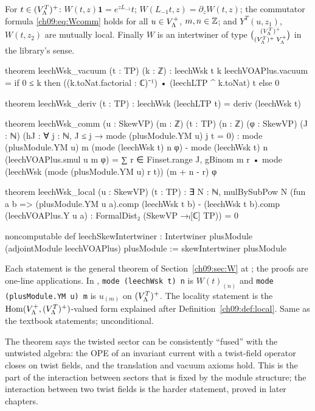 \begin{theorem}\label{ch09:thm:leechW}
For $t\in(V_{\Lambda}^{T})^{+}$: $W(t,z)\mathbf1=e^{zL_{-1}}t$; $W(L_{-1}t,z)=\partial_zW(t,z)$; the
commutator formula \eqref{ch09:eq:Wcomm} holds for all $u\in V_{\Lambda}^{+}$, $m,n\in{\mathbb{Z}}$; and
$Y^T(u,z_1)$, $W(t,z_2)$ are mutually local. Finally $W$ is an intertwiner of type
$\binom{(V_{\Lambda}^{T})^{+}}{(V_{\Lambda}^{T})^{+}\;V_{\Lambda}^{+}}$ in the library's sense.
\end{theorem}
\begin{leancode}
theorem leechWsk_vacuum (t : TP) (k : ℤ) :
    leechWsk t k leechVOAPlus.vacuum
      = if 0 ≤ k then ((k.toNat.factorial : ℂ)⁻¹) • (leechLTP ^ k.toNat) t else 0

theorem leechWsk_deriv (t : TP) : leechWsk (leechLTP t) = deriv (leechWsk t)

theorem leechWsk_comm (u : SkewVP) (m : ℤ) (t : TP) (n : ℤ) (φ : SkewVP) (J : ℕ)
    (hJ : ∀ j : ℕ, J ≤ j → mode (plusModule.YM u) j t = 0) :
    mode (plusModule.YM u) m (mode (leechWsk t) n φ)
        - mode (leechWsk t) n (leechVOAPlus.smul u m φ)
      = ∑ r ∈ Finset.range J,
          gBinom m r • mode (leechWsk (mode (plusModule.YM u) r t)) (m + n - r) φ

theorem leechWsk_local (u : SkewVP) (t : TP) :
    ∃ N : ℕ, mulBySubPow N
      (fun a b => (plusModule.YM u a).comp (leechWsk t b)
        - (leechWsk t b).comp (leechVOAPlus.Y u a) : FormalDist₂ (SkewVP →ₗ[ℂ] TP)) = 0

noncomputable def leechSkewIntertwiner :
    Intertwiner plusModule (adjointModule leechVOAPlus) plusModule :=
  skewIntertwiner plusModule
\end{leancode}
\begin{dictionary}
Each statement is the general theorem of Section~\ref{ch09:sec:W} at
; the proofs are one-line applications. In
, \texttt{mode (leechWsk t) n} is $W(t)_{(n)}$ and
\texttt{mode (plusModule.YM u) m} is $u_{(m)}$ on $(V_{\Lambda}^{T})^{+}$. The locality statement is the
$\operatorname{Hom}(V_{\Lambda}^{+},(V_{\Lambda}^{T})^{+})$-valued form explained after
Definition~\ref{ch09:def:local}. Same as the textbook statements; unconditional.
\end{dictionary}
\begin{physics}
The theorem says the twisted sector can be consistently ``fused'' with the untwisted algebra: the OPE of an invariant current with a twist-field operator closes on twist fields, and the translation and vacuum axioms hold. This is the part of the interaction between sectors that is fixed by the module structure; the interaction between two twist fields is the harder statement, proved in later chapters.
\end{physics}

